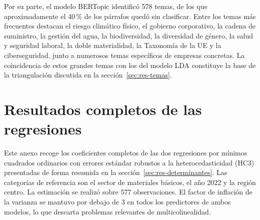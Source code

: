 \bigskip
Por su parte, el modelo BERTopic identificó 578 temas, de los que aproximadamente el 40\,\% de
los párrafos quedó sin clasificar. Entre los temas más frecuentes destacan el riesgo climático
físico, el gobierno corporativo, la cadena de suministro, la gestión del agua, la biodiversidad,
la diversidad de género, la salud y seguridad laboral, la doble materialidad, la Taxonomía de la
UE y la ciberseguridad, junto a numerosos temas específicos de empresas concretas. La
coincidencia de estos grandes temas con los del modelo LDA constituye la base de la triangulación
discutida en la sección~\ref{sec:res-temas}.

\chapter{Resultados completos de las regresiones}
\label{anexo:regresiones}

Este anexo recoge los coeficientes completos de las dos regresiones por mínimos cuadrados
ordinarios con errores estándar robustos a la heterocedasticidad (HC3) presentadas de forma
resumida en la sección~\ref{sec:res-determinantes}. Las categorías de referencia son el sector
de materiales básicos, el año 2022 y la región centro. La estimación se realizó sobre 577
observaciones. El factor de inflación de la varianza se mantuvo por debajo de 3 en todos los
predictores de ambos modelos, lo que descarta problemas relevantes de multicolinealidad.

